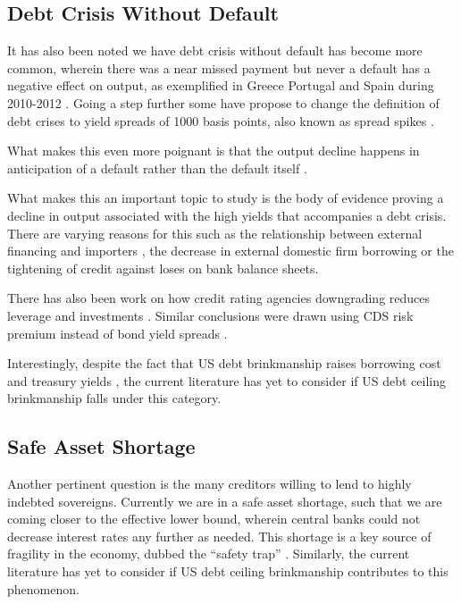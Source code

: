 \documentclass[
  12pt]{article}
\begin{document}
\hypertarget{debt-crisis-without-default}{%
\subsection{Debt Crisis Without
Default}\label{debt-crisis-without-default}}

It has also been noted we have debt crisis without default has become
more common, wherein there was a near missed payment but never a default
has a negative effect on output, as exemplified in Greece Portugal and
Spain during 2010-2012 \citep{mitchener2023} . Going a step further some
have propose to change the definition of debt crises to yield spreads of
1000 basis points, also known as spread spikes
\citep{broner2013, aguiar, krishnamurthy}.

What makes this even more poignant is that the output decline happens in
anticipation of a default rather than the default itself
\citep{yeyati2011}.

What makes this an important topic to study is the body of evidence
proving a decline in output associated with the high yields that
accompanies a debt crisis. There are varying reasons for this such as
the relationship between external financing and importers
\citep{mendoza2012}, the decrease in external domestic firm
borrowing\citep{corsetti2012, das2010, gourinchas2016} or the tightening
of credit against loses on bank balance
sheets\citep{arellano, ferrando2017}.

There has also been work on how credit rating agencies downgrading
reduces leverage and investments \citep{almeida2017}. Similar
conclusions were drawn using CDS risk premium instead of bond yield
spreads \citep{brutti2015, bahaj2020}.

Interestingly, despite the fact that US debt brinkmanship raises
borrowing cost and treasury yields \citep{nippani2017}, the current
literature has yet to consider if US debt ceiling brinkmanship falls
under this category.

\hypertarget{safe-asset-shortage}{%
\subsection{Safe Asset Shortage}\label{safe-asset-shortage}}

Another pertinent question is the many creditors willing to lend to
highly indebted sovereigns. Currently we are in a safe asset shortage,
such that we are coming closer to the effective lower bound, wherein
central banks could not decrease interest rates any further as needed.
This shortage is a key source of fragility in the economy, dubbed the
``safety trap'' \citep{caballero2017} . Similarly, the current
literature has yet to consider if US debt ceiling brinkmanship
contributes to this phenomenon.
\end{document}

